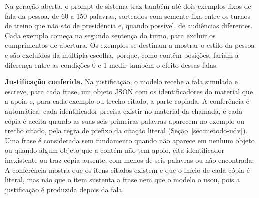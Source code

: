 Na geração aberta, o prompt de sistema traz também até dois exemplos fixos de fala da pessoa, de 60 a
150 palavras, sorteados com semente fixa entre os turnos de treino que não são de presidência e,
quando possível, de audiências diferentes. Cada exemplo começa na segunda sentença do turno, para
excluir os cumprimentos de abertura. Os exemplos se destinam a mostrar o estilo da pessoa e são
excluídos da múltipla escolha, porque, como contêm posições, fariam a diferença entre as condições 0
e 1 medir também o efeito dessas falas.

\textbf{Justificação conferida.} Na justificação, o modelo recebe a fala simulada e escreve, para cada
frase, um objeto JSON com os identificadores do material que a apoia e, para cada exemplo ou trecho
citado, a parte copiada. A conferência é automática: cada identificador precisa existir no material
da chamada, e cada cópia é aceita quando as suas seis primeiras palavras aparecem no exemplo ou trecho
citado, pela regra de prefixo da citação literal (Seção~\ref{sec:metodo-udv}). Uma frase é
considerada sem fundamento quando não aparece em nenhum objeto ou quando algum objeto que a contém não
tem apoio, cita identificador inexistente ou traz cópia ausente, com menos de seis palavras ou não
encontrada. A conferência mostra que os itens citados existem e que o início de cada cópia é literal,
mas não que o item sustenta a frase nem que o modelo o usou, pois a justificação é produzida depois
da fala.
